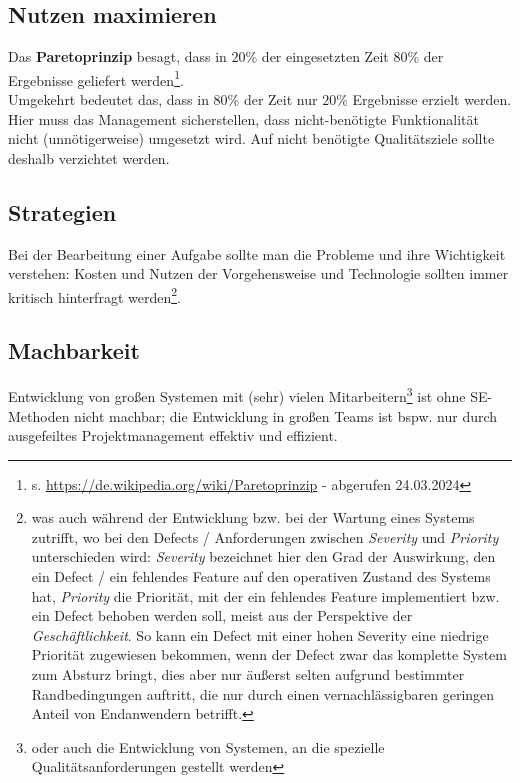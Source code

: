 \subsection*{Nutzen maximieren}
Das \textbf{Paretoprinzip} besagt, dass in $20$\% der eingesetzten Zeit $80$\% der Ergebnisse geliefert werden\footnote{
s. \url{https://de.wikipedia.org/wiki/Paretoprinzip} - abgerufen 24.03.2024
}.\\
Umgekehrt bedeutet das, dass in $80$\% der Zeit nur $20$\% Ergebnisse erzielt werden.\\
Hier muss das Management sicherstellen, dass nicht-benötigte Funktionalität nicht (unnötigerweise) umgesetzt wird.
Auf nicht benötigte Qualitätsziele sollte deshalb verzichtet werden.\\

\subsection*{Strategien}
Bei der Bearbeitung einer Aufgabe sollte man die Probleme und ihre Wichtigkeit verstehen: Kosten und Nutzen der Vorgehensweise und Technologie sollten immer kritisch hinterfragt werden\footnote{
    was auch während der Entwicklung bzw. bei der Wartung eines Systems zutrifft, wo bei den Defects / Anforderungen zwischen \textit{Severity} und \textit{Priority} unterschieden wird: \textit{Severity} bezeichnet hier den Grad der Auswirkung, den ein Defect / ein fehlendes Feature auf den operativen Zustand des Systems hat, \textit{Priority} die Priorität, mit der ein fehlendes Feature implementiert bzw. ein Defect behoben werden soll, meist aus der Perspektive der \textit{Geschäftlichkeit}. So kann ein Defect mit einer hohen Severity eine niedrige Priorität zugewiesen bekommen, wenn der Defect zwar das komplette System zum Absturz bringt, dies aber nur äußerst selten aufgrund bestimmter Randbedingungen auftritt, die nur durch einen vernachlässigbaren geringen Anteil von Endanwendern betrifft.
}.

\subsection*{Machbarkeit}
Entwicklung von großen Systemen mit (sehr) vielen Mitarbeitern\footnote{
oder auch die Entwicklung von Systemen, an die spezielle Qualitätsanforderungen gestellt werden} ist ohne SE-Methoden nicht machbar; die Entwicklung in großen Teams ist bspw. nur durch ausgefeiltes Projektmanagement effektiv und effizient.